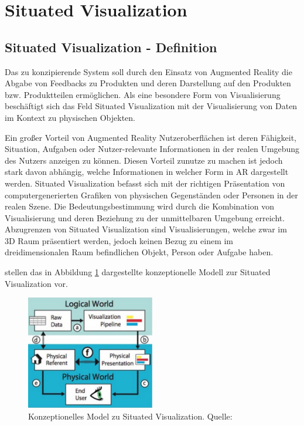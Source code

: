 \section{Situated Visualization}
\subsection{Situated Visualization - Definition}


Das zu konzipierende System soll durch den Einsatz von Augmented Reality die Abgabe von Feedbacks zu Produkten und deren Darstellung auf den Produkten bzw. Produktteilen ermöglichen. 
Als eine besondere Form von Visualisierung beschäftigt sich das Feld Situated Visualization mit der Visualisierung von Daten im Kontext zu physischen Objekten. 

\cite[S.~239]{DieterSchmalstieg2016} Ein großer Vorteil von Augmented Reality Nutzeroberflächen ist deren Fähigkeit, Situation, Aufgaben oder Nutzer-relevante Informationen in 
der realen Umgebung des Nutzers anzeigen zu können. Diesen Vorteil zunutze zu machen ist jedoch stark davon abhängig, welche Informationen in welcher Form in AR dargestellt werden.
Situated Visualization befasst sich mit der richtigen Präsentation von computergenerierten
Grafiken von physischen Gegenständen oder Personen in der realen Szene. \cite[S.~188]{Marriott2018} Die Bedeutungsbestimmung wird durch die Kombination von Visualisierung und deren 
Beziehung zu der unmittelbaren Umgebung erreicht. \cite[S.~240]{DieterSchmalstieg2016} Abzugrenzen von Situated Visualization sind Visualisierungen, welche zwar im 3D Raum präsentiert werden, jedoch keinen Bezug zu einem im dreidimensionalen Raum befindlichen Objekt, Person oder Aufgabe haben.

\cite[S.~192]{Marriott2018} \cite[S.~2]{Willett2017} stellen das in Abbildung \ref{img:situated_visualization_concept} dargestellte konzeptionelle Modell 
zur Situated Visualization vor.

\begin{figure}[H]
	\centering
	\includegraphics[width=0.5\textwidth]{resources/fundamentals/situated_visualization/spacially_situated_visualization_model.png}
	\caption{Konzeptionelles Model zu Situated Visualization. Quelle: \cite[S.~192]{Marriott2018}}
	\label{img:situated_visualization_concept}
\end{figure}

